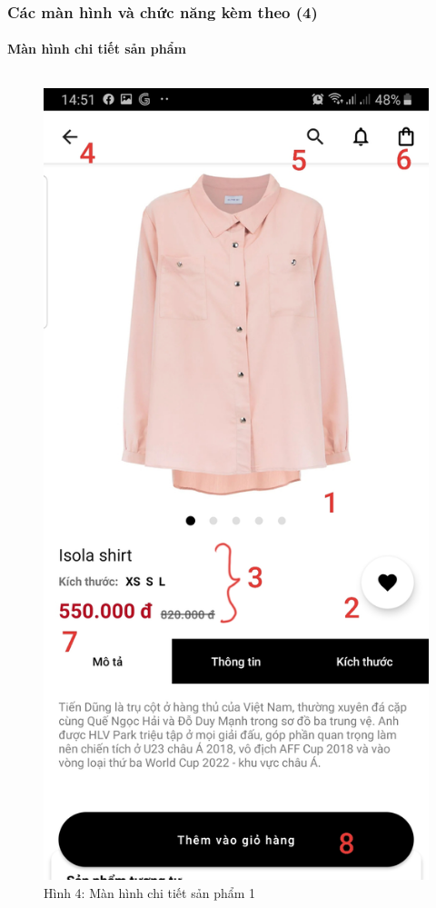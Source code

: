 \documentclass{beamer}
\begin{document}
\begin{frame}
    \frametitle{Các màn hình và chức năng kèm theo (4)}
    \framesubtitle{Màn hình chi tiết sản phẩm}

    \begin{columns}
        \begin{figure}
            \centering
            \includegraphics[height=0.7\textheight]{images/03.png}
            \caption{\centering\tiny{Hình 4: Màn hình chi tiết sản phẩm 1}}


\end{figure}
\end{columns}
\end{frame}
\end{document}
